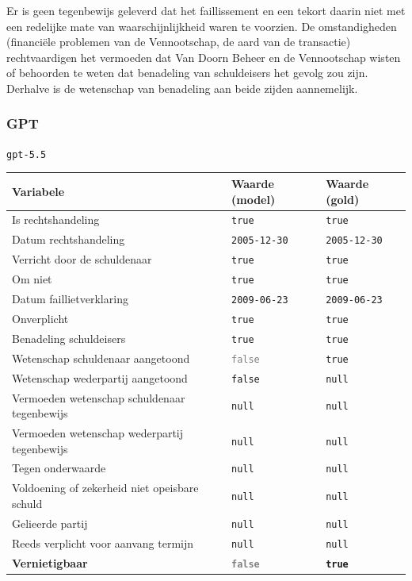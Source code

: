 \documentclass[
  dutch,
  a4paper,
]{article}
\begin{document}
Er is geen tegenbewijs geleverd dat het faillissement en een tekort daarin niet met een redelijke mate van waarschijnlijkheid waren te voorzien. De omstandigheden (financiële problemen van de Vennootschap, de aard van de transactie) rechtvaardigen het vermoeden dat Van Doorn Beheer en de Vennootschap wisten of behoorden te weten dat benadeling van schuldeisers het gevolg zou zijn. Derhalve is de wetenschap van benadeling aan beide zijden aannemelijk.

\newpage


\subsubsection{GPT}\label{gpt-2}

\texttt{gpt-5.5}

\begin{center}
\small
\begin{tabular}{@{}p{7.4cm}p{2.6cm}p{2.6cm}@{}}
\toprule
Variabele & Waarde (model) & Waarde (gold) \\
\midrule
Is rechtshandeling & \texttt{true} & \texttt{true} \\
Datum rechtshandeling & \texttt{2005-12-30} & \texttt{2005-12-30} \\
Verricht door de schuldenaar & \texttt{true} & \texttt{true} \\
Om niet & \texttt{true} & \texttt{true} \\
Datum faillietverklaring & \texttt{2009-06-23} & \texttt{2009-06-23} \\
Onverplicht & \texttt{true} & \texttt{true} \\
Benadeling schuldeisers & \texttt{true} & \texttt{true} \\
Wetenschap schuldenaar aangetoond & \textcolor{gray}{\texttt{false}} & \texttt{true} \\
Wetenschap wederpartij aangetoond & \texttt{false} & \texttt{null} \\
Vermoeden wetenschap schuldenaar tegenbewijs & \texttt{null} & \texttt{null} \\
Vermoeden wetenschap wederpartij tegenbewijs & \texttt{null} & \texttt{null} \\
Tegen onderwaarde & \texttt{null} & \texttt{null} \\
Voldoening of zekerheid niet opeisbare schuld & \texttt{null} & \texttt{null} \\
Gelieerde partij & \texttt{null} & \texttt{null} \\
Reeds verplicht voor aanvang termijn & \texttt{null} & \texttt{null} \\
\textbf{Vernietigbaar} & \textbf{\textcolor{gray}{\texttt{false}}} & \textbf{\texttt{true}} \\
\bottomrule
\end{tabular}
\end{center}
\end{document}
